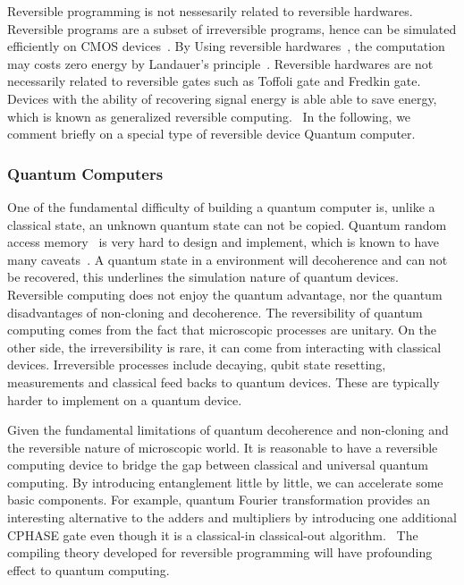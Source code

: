 \documentclass[aps,twocolumn,longbibliography,english,superscriptaddress]{revtex4-1}
\newcommand{\<}{\langle}
\renewcommand{\>}{\rangle}
\theoremstyle{definition}\newtheorem{definition}{\textit{Definition}}
\begin{document}
Reversible programming is not nessesarily related to reversible hardwares. Reversible programs are a subset of irreversible programs, hence can be simulated efficiently on CMOS devices~\cite{Vieri1999}. By Using reversible hardwares~\cite{}, the computation may costs zero energy by Landauer's principle~\cite{Landauer1961}.
Reversible hardwares are not necessarily related to reversible gates such as Toffoli gate and Fredkin gate.
Devices with the ability of recovering signal energy is able able to save energy, which is known as generalized reversible computing.~\cite{Frank2005,Frank2017b}
In the following, we comment briefly on a special type of reversible device Quantum computer.

\subsubsection{Quantum Computers}\label{sec:qc}
One of the fundamental difficulty of building a quantum computer is, unlike a classical state, an unknown quantum state can not be copied.
Quantum random access memory~\cite{Giovannetti2008} is very hard to design and implement, which is known to have many caveats~\cite{Aaronson2015}.
A quantum state in a environment will decoherence and can not be recovered, this underlines the simulation nature of quantum devices.
Reversible computing does not enjoy the quantum advantage, nor the quantum disadvantages of non-cloning and decoherence.
The reversibility of quantum computing comes from the fact that microscopic processes are unitary.
On the other side, the irreversibility is rare, it can come from interacting with classical devices. Irreversible processes include decaying, qubit state resetting, measurements and classical feed backs to quantum devices. These are typically harder to implement on a quantum device.

Given the fundamental limitations of quantum decoherence and non-cloning and the reversible nature of microscopic world.
It is reasonable to have a reversible computing device to bridge the gap between classical and universal quantum computing.
By introducing entanglement little by little, we can accelerate some basic components. For example, quantum Fourier transformation provides an interesting alternative to the adders and multipliers by introducing one additional CPHASE gate even though it is a classical-in classical-out algorithm.~\cite{RuizPerez2017}
The compiling theory developed for reversible programming will have profounding effect to quantum computing.
\end{document}
